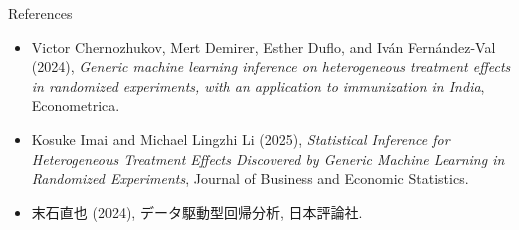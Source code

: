 \documentclass[xcolor=svgnames,aspectratio=169]{beamer}
\begin{document}
\begin{frame}{References}
    \begin{itemize}
        \item Victor Chernozhukov, Mert Demirer, Esther Duflo, and Iván Fernández-Val (2024), \textit{Generic machine learning inference on heterogeneous treatment effects in randomized experiments, with an application to immunization in India}, Econometrica.
        \item Kosuke Imai and Michael Lingzhi Li (2025), \textit{Statistical Inference for Heterogeneous Treatment Effects Discovered by Generic Machine Learning in Randomized Experiments}, Journal of Business and Economic Statistics.
        \item 末石直也 (2024), データ駆動型回帰分析, 日本評論社.
    \end{itemize}
\end{frame}
\end{document}

